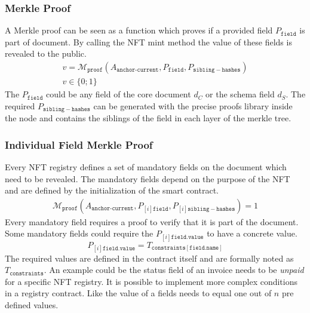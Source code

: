 \subsubsection{Merkle Proof}
A Merkle proof can be seen as a function which proves if a provided field $P_\mathtt{field}$ is part of document. By calling the NFT mint method the value of these fields is revealed to the public. 
\begin{equation}
\begin{split}
v = \mathcal{M}_{\texttt{proof}}(A_{\texttt{anchor-current}},P_\mathtt{field},P_\mathtt{sibling-hashes}) \\
v \in \{0;1\}
\end{split}
\end{equation}
The $P_\mathtt{field}$  could be any field of the core document $d_C$ or the schema field $d_S$. The required $P_\mathtt{sibling-hashes}$ can be generated with the precise proofs library inside the node and contains the siblings of the field in each layer of the merkle tree.  
\subsubsection{Individual Field Merkle Proof}
Every NFT registry defines a set of mandatory fields on the document which need to be revealed. The mandatory fields depend on the purpose of the NFT and are defined by the initialization of the smart contract.
\begin{equation}
\begin{split}
\mathcal{M}_{\texttt{proof}}(A_{\texttt{anchor-current}} ,P_{[i]\mathtt{field}},P_{[i]\mathtt{sibling-hashes}}) = 1
\end{split}
\end{equation}
Every mandatory field requires a proof to verify that it is part of the document. Some mandatory fields could require the $P_{[i]\mathtt{field.value}}$ to have a concrete value.
\begin{equation}
    P_{[i]\mathtt{field.value}} = T_{\mathtt{constraints}[\mathtt{field.name}]}
\end{equation}
The required values are defined in the contract itself and are formally noted as $T_{\mathtt{constraints}}$. An example could be the status field of an invoice needs to be \textit{unpaid} for a specific NFT registry. It is possible to implement more complex conditions in a registry contract. Like the value of a fields needs to equal one out of $n$ pre defined values. 

